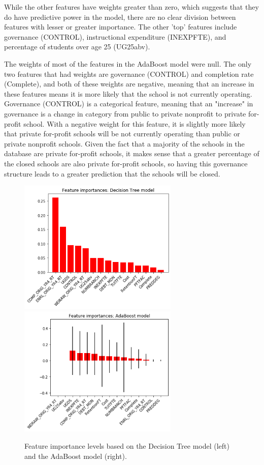 \documentclass[11pt, letterpaper]{article}
\begin{document}
While the other features have weights greater than zero, which suggests that they do have predictive power in the model, there are no clear division between features with lesser or greater importance. The other 'top' features include governance (CONTROL), instructional expenditure (INEXPFTE), and percentage of students over age 25 (UG25abv).

The weights of most of the features in the AdaBoost model were null. The only two features that had weights are governance (CONTROL) and completion rate (Complete), and both of these weights are negative, meaning that an increase in these features means it is more likely that the school is not currently operating. Governance (CONTROL) is a categorical feature, meaning that an "increase" in governance is a change in category from public to private nonprofit to private for-profit school. With a negative weight for this feature, it is slightly more likely that private for-profit schools will be not currently operating than public or private nonprofit schools. Given the fact that a majority of the schools in the database are private for-profit schools, it makes sense that a greater percentage of the closed schools are also private for-profit schools, so having this governance structure leads to a greater prediction that the schools will be closed.

\begin{figure}[h]
\begin{center}
\includegraphics[width=3in]{DTFeatureImportance.png}
\includegraphics[width=3in]{ABFeatureImportance.png}

\caption{Feature importance levels based on the Decision Tree model (left) and the AdaBoost model (right).} 
\label{fig:Features}
\end{center}
\end{figure}
\end{document}
